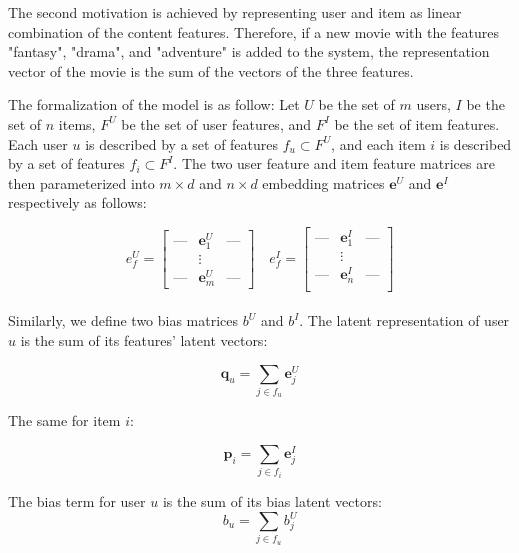 \noindent The second motivation is achieved by representing user and item as linear combination of the content features. Therefore, if a new movie with the features "fantasy", "drama", and "adventure" is added to the system, the representation vector of the movie is the sum of the vectors of the three features. 

\noindent The formalization of the model is as follow:
Let \(U\) be the set of \(m\) users, \(I\) be the set of \(n\)  items, \(F^U\) be the set of user features, and \(F^I\) be the set of item features. Each user \(u\) is described by a set of features \(f_u \subset F^U\), and each item \(i\) is described by a set of features \(f_i \subset F^I\). The two user feature and item feature matrices are then parameterized into \(m \times d\) and \(n \times d\) embedding matrices \(\boldsymbol{e}^U\) and \(\boldsymbol{e}^I\) respectively as follows:

\[
e_f^U = \begin{bmatrix}
\mbox{---} & \boldsymbol{e}_1^U & \mbox{---} \\
 & \vdots & \\ 
\mbox{---} & \boldsymbol{e}_m^U & \mbox{---}
\end{bmatrix} \quad
e_f^I = 
\begin{bmatrix}
\mbox{---} & \boldsymbol{e}_1^I & \mbox{---} \\
 & \vdots &  \\ 
\mbox{---}& \boldsymbol{e}_n^I& \mbox{---}\\
\end{bmatrix}
\]
\\


\noindent Similarly, we define two bias matrices \(b^U\) and \(b^I\). The latent representation of user \(u\) is the sum of its features' latent vectors:

\begin{displaymath}
\boldsymbol{q}_u = \sum_{j \in f_u} \boldsymbol{e}_j^U
\end{displaymath}

\noindent The same for item \(i\):

\begin{displaymath}
\boldsymbol{p}_i = \sum_{j \in f_i} \boldsymbol{e}_j^I
\end{displaymath}

\noindent The bias term for user \(u\) is the sum of its bias latent vectors:
\begin{displaymath}
b_u = \sum_{j \in f_u} b_j^U
\end{displaymath}

